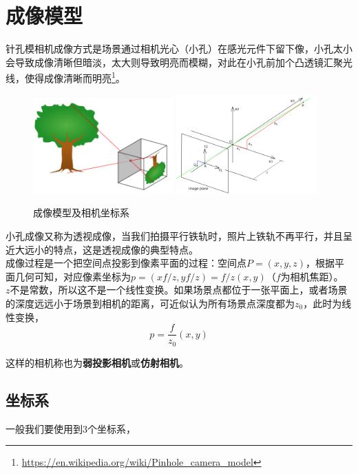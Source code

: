 \section{成像模型}
	针孔模相机成像方式是场景通过相机光心（小孔）在感光元件下留下像，小孔太小会导致成像清晰但暗淡，太大则导致明亮而模糊，对此在小孔前加个凸透镜汇聚光线，使得成像清晰而明亮\footnote{\url{https://en.wikipedia.org/wiki/Pinhole_camera_model}}。

	\begin{figure}[H]
		\begin{center}
			\includegraphics[width=0.48\textwidth]{../images/pinhole.png}
			\includegraphics[width=0.48\textwidth]{../images/pinhole_coor.png}
		\end{center}
		\caption{成像模型及相机坐标系}
	\end{figure}

	小孔成像又称为透视成像，当我们拍摄平行铁轨时，照片上铁轨不再平行，并且呈近大远小的特点，这是透视成像的典型特点。\\

	成像过程是一个把空间点投影到像素平面的过程：空间点$P=(x,y,z)$，根据平面几何可知，对应像素坐标为$p = (xf/z, yf/z) = f/z(x,y)$（$f$为相机焦距）。\\
	
	$z$不是常数，所以这不是一个线性变换。如果场景点都位于一张平面上，或者场景的深度远远小于场景到相机的距离，可近似认为所有场景点深度都为$z_0$，此时为线性变换，
	$$
		p = \frac{f}{z_0}(x,y)
	$$

	这样的相机称也为\textbf{弱投影相机}或\textbf{仿射相机}。

\subsection{坐标系}
	一般我们要使用到3个坐标系，

